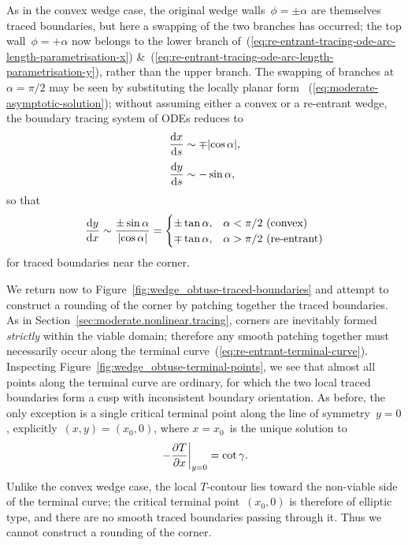As in the convex wedge case,
the original wedge walls~$\phi = \pm\alpha$
are themselves traced boundaries,
but here a swapping of the two branches has occurred;
the top wall~$\phi = +\alpha$ now belongs to the lower branch
of~(\ref{eq:re-entrant-tracing-ode-arc-length-parametrisation-x})
\&~(\ref{eq:re-entrant-tracing-ode-arc-length-parametrisation-y}),
rather than the upper branch.
The swapping of branches at~$\alpha = \pi/2$ may be seen
by substituting the locally planar form~%
  (\ref{eq:moderate-asymptotic-solution});
without assuming either a convex or a re-entrant wedge,
the boundary tracing system of ODEs reduces to
\begin{align}
  \tder{x}{s} &\asy \mp \abs{\cos\alpha},
    \label{eq:planar-asymptotic-tracing-ode-arc-length-parametrisation-x}
    \\[\tallspace]
  \tder{y}{s} &\asy -\sin\alpha,
    \label{eq:planar-asymptotic-tracing-ode-arc-length-parametrisation-y}
\end{align}
so that
\begin{equation}
  \tder{y}{x} \asy \frac{\pm\sin\alpha}{\abs{\cos\alpha}} =
    \begin{cases}
      \pm\tan\alpha, &\text{$\alpha < \pi/2$ (convex)} \\
      \mp\tan\alpha, &\text{$\alpha > \pi/2$ (re-entrant)}
    \end{cases}
  \label{eq:planar-asymptotic-tracing-ode-coordinate-parametrisation-y}
\end{equation}
for traced boundaries near the corner.

\begin{figure}
\end{figure}

We return now to
Figure~\ref{fig:wedge_obtuse-traced-boundaries}
and attempt to construct a rounding of the corner
by patching together the traced boundaries.
As in Section~\ref{sec:moderate.nonlinear.tracing},
corners are inevitably formed \emph{strictly} within the viable domain;
therefore any smooth patching together must necessarily occur
along the terminal curve~(\ref{eq:re-entrant-terminal-curve}).
Inspecting Figure~\ref{fig:wedge_obtuse-terminal-points},
we see that almost all points along the terminal curve are ordinary,
for which the two local traced boundaries form a cusp
with inconsistent boundary orientation.
As before, the only exception is
a single critical terminal point
along the line of symmetry~$y = 0$,
explicitly~$(x, y) = (x_0, 0)$,
where $x = x_0$~is the unique solution to
\begin{equation}
  \eval*{-\pder{T}{x}}_{y=0} = \cot\gamma.
  \label{eq:re-entrant-critical-terminal-point}
\end{equation}
Unlike the convex wedge case,
the local $T$-contour lies toward
the non-viable side of the terminal curve;
the critical terminal point~$(x_0, 0)$ is therefore of elliptic type,
and there are no smooth traced boundaries passing through it.
Thus we cannot construct a rounding of the corner.

